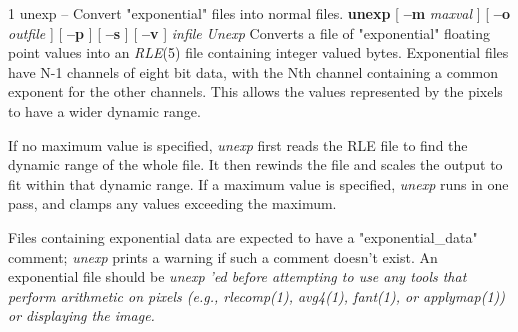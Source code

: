 \newpage


%
%
%
 1
unexp -- Convert "exponential" files into normal files.
{\bf unexp}
[
{\bf --m}
{\it maxval}
] [
{\bf --o}
{\it outfile}
] [
{\bf --p}
] [
{\bf --s}
] [
{\bf --v}
] 
{\it infile}
{\it Unexp}
Converts a file of "exponential" floating point values into an 
{\it RLE}{\rm (5)}
file containing integer valued bytes.  Exponential files have N-1 channels of
eight bit data, with the Nth channel containing a common exponent for
the other channels.  This allows the values represented by the pixels to have 
a wider dynamic range.

If no maximum value is specified, 
{\it unexp}
first reads the RLE file to find
the dynamic range of the whole file.  It then rewinds the file and scales
the output to fit within that dynamic range.  If a maximum value is specified,
{\it unexp}
runs in one pass, and clamps any values exceeding the maximum.  

Files containing exponential data are expected to have a 
"exponential\_data" comment; 
{\it unexp}
prints a warning if such a comment
doesn't exist.  An exponential file should be %
\it unexp\rm%
'ed before
attempting to use any tools that perform arithmetic on pixels (e.g.,
{\it rlecomp}{\rm (1),}
{\it avg4}{\rm (1),}
{\it fant}{\rm (1),}
or
{\it applymap}{\rm (1))}
or displaying the image.

